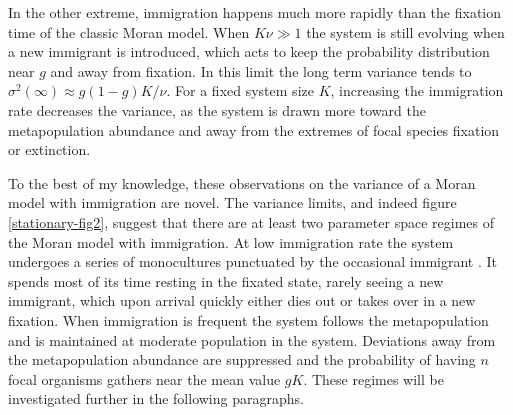 In the other extreme, immigration happens much more rapidly than the fixation time of the classic Moran model. 
When $K\nu\gg 1$ the system is still evolving when a new immigrant is introduced, which acts to keep the probability distribution near $g$ and away from fixation. 
In this limit the long term variance tends to $\sigma^2(\infty) \approx g(1-g) K/\nu$. 
For a fixed system size $K$, increasing the immigration rate decreases the variance, as the system is drawn more toward the metapopulation abundance and away from the extremes of focal species fixation or extinction. 

To the best of my knowledge, these observations on the variance of a Moran model with immigration are novel. 
The variance limits, and indeed figure \ref{stationary-fig2}, suggest that there are at least two parameter space regimes of the Moran model with immigration. 
At low immigration rate the system undergoes a series of monocultures punctuated by the occasional immigrant \cite{Desai2007}. 
It spends most of its time resting in the fixated state, rarely seeing a new immigrant, which upon arrival quickly either dies out or takes over in a new fixation. 
When immigration is frequent the system follows the metapopulation and is maintained at moderate population in the system. 
Deviations away from the metapopulation abundance are suppressed and the probability of having $n$ focal organisms gathers near the mean value $g K$. 
%
These regimes will be investigated further in the following paragraphs. 

